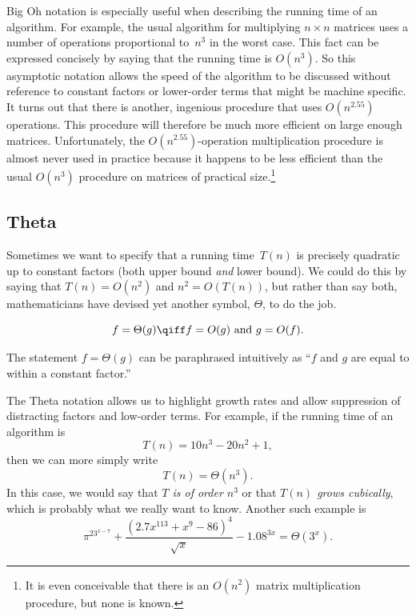 Big Oh notation is especially useful when describing the running time
of an algorithm.  For example, the usual algorithm for multiplying $n
\times n$ matrices uses a number of operations proportional to~$n^3$
in the worst case.  This fact can be expressed concisely by saying
that the running time is $O(n^3)$.  So this asymptotic notation allows
the speed of the algorithm to be discussed without reference to
constant factors or lower-order terms that might be machine specific.
It turns out that there is another, ingenious  procedure that uses $O(n^{2.55})$ operations.  This
procedure will therefore be much more efficient on large enough
matrices.  Unfortunately, the $O(n^{2.55})$-operation multiplication
procedure is almost never used in practice because it happens to be
less efficient than the usual $O(n^3)$ procedure on matrices of
practical size.\footnote{It is even conceivable that there is an
  $O(n^2)$ matrix multiplication procedure, but none is known.}

\subsection{\index{$\Theta()$}Theta}

Sometimes we want to specify that a running time~$T(n)$ is precisely
quadratic up to constant factors (both upper bound \emph{and} lower
bound).  We could do this by saying that $T(n) = O(n^2)$ and $n^2 =
O(T(n))$, but rather than say both, mathematicians have devised yet
another symbol, $\Theta$, to do the job.

\begin{definition}\label{def:Theta}
\[
    f = \Theta(g)
    \qiff
    f=O(g) \text{ and } g=O(f).
\]
\end{definition}

The statement $f = \Theta(g)$ can be paraphrased intuitively as
``$f$ and $g$ are equal to within a constant factor.''

The Theta notation allows us to highlight growth rates and allow
suppression of distracting factors and low-order terms.  For example,
if the running time of an algorithm is
\[
T(n) = 10n^3 - 20n^2 + 1,
\]
then we can more simply write
\[
T(n) = \Theta(n^3).
\]
In this case, we would say that \emph{$T$ is of order $n^3$} or that
\emph{$T(n)$ grows cubically}, which is probably what we really want
to know.  Another such example is
\[
{{\pi^23^{x-7} + \frac{(2.7x^{113} + x^9- 86)^4}{\sqrt{x}} - 1.08^{3x}}} =
\Theta(3^x).
\]

